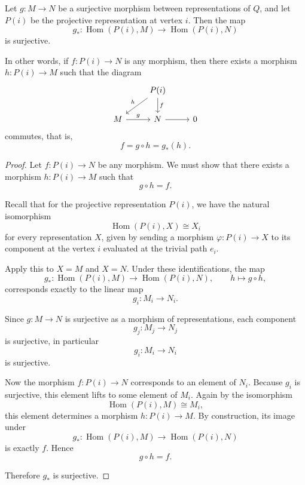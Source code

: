 \documentclass[11pt, a4paper]{report}
\begin{document}
\begin{proposition}
    Let $g : M \to N$ be a surjective morphism between representations of $Q$, and let $P(i)$ be the projective representation at vertex $i$. Then the map
    \[
        g_* : \operatorname{Hom}(P(i),M)\longrightarrow \operatorname{Hom}(P(i),N)
    \]
    is surjective.

    In other words, if $f : P(i)\to N$ is any morphism, then there exists a morphism
    $h : P(i)\to M$ such that the diagram
    \[
        \begin{tikzcd}
            & P(i) \arrow[dl, "h"'] \arrow[d, "f"] \\
            M \arrow[r, "g"] & N \arrow[r] & 0
        \end{tikzcd}
    \]
    commutes, that is,
    \[
        f=g\circ h=g_*(h).
    \]
\end{proposition}

\begin{proof}
    Let $f:P(i)\to N$ be any morphism. We must show that there exists a morphism
    $h:P(i)\to M$ such that
    \[
        g\circ h=f.
    \]

    Recall that for the projective representation $P(i)$, we have the natural
    isomorphism
    \[
        \operatorname{Hom}(P(i),X)\cong X_i
    \]
    for every representation $X$, given by sending a morphism $\varphi:P(i)\to X$
    to its component at the vertex $i$ evaluated at the trivial path $e_i$.

    Apply this to $X=M$ and $X=N$. Under these identifications, the map
    \[
        g_*:\operatorname{Hom}(P(i),M)\to \operatorname{Hom}(P(i),N),\qquad
        h\mapsto g\circ h,
    \]
    corresponds exactly to the linear map
    \[
        g_i:M_i\to N_i.
    \]

    Since $g:M\to N$ is surjective as a morphism of representations, each component
    \[
        g_j:M_j\to N_j
    \]
    is surjective, in particular
    \[
        g_i:M_i\to N_i
    \]
    is surjective.

    Now the morphism $f:P(i)\to N$ corresponds to an element of $N_i$. Because
    $g_i$ is surjective, this element lifts to some element of $M_i$. Again by the
    isomorphism
    \[
        \operatorname{Hom}(P(i),M)\cong M_i,
    \]
    this element determines a morphism $h:P(i)\to M$. By construction, its image
    under
    \[
        g_*:\operatorname{Hom}(P(i),M)\to \operatorname{Hom}(P(i),N)
    \]
    is exactly $f$. Hence
    \[
        g\circ h=f.
    \]

    Therefore $g_*$ is surjective.
\end{proof}
\end{document}
